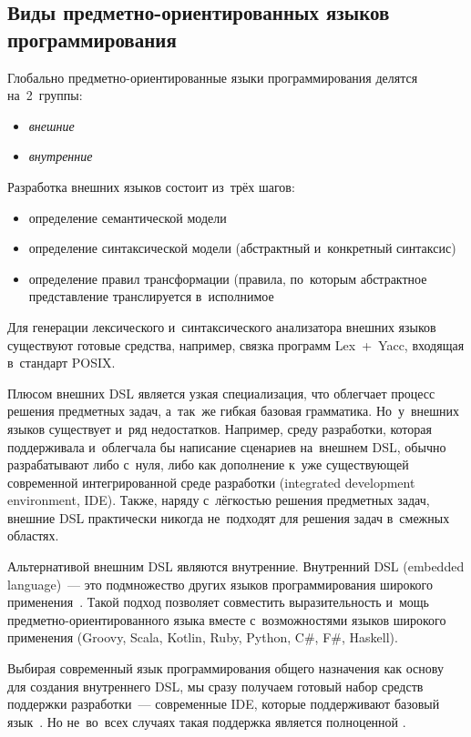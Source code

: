 \subsection{Виды предметно-ориентированных языков программирования} \label{sub122}
Глобально предметно-ориентированные языки программирования делятся на~2~группы: 
\begin{itemize} 
	\item{\textit{внешние}}
	\item{\textit{внутренние}}
\end{itemize}

Разработка внешних языков состоит из~трёх шагов:

\begin{itemize} 
	\item{определение семантической модели}
	\item{определение синтаксической модели (абстрактный и~конкретный синтаксис)}
	\item{определение правил трансформации (правила, по~которым абстрактное представление транслируется в~исполнимое}
\end{itemize}

Для генерации
лексического и~синтаксического анализатора внешних языков существуют готовые средства, например, связка программ Lex~+~Yacc, входящая в~стандарт POSIX. 

Плюсом внешних DSL является узкая специализация, что облегчает процесс решения предметных задач, а~так~же гибкая базовая грамматика. Но~у~внешних языков существует и~ряд недостатков. Например, среду разработки, которая поддерживала и~облегчала бы написание сценариев на~внешнем
DSL, обычно разрабатывают либо с~нуля, либо как
дополнение к~уже существующей современной интегрированной среде разработки (integrated
development environment, IDE). Также, наряду с~лёгкостью решения предметных задач, внешние DSL практически никогда не~подходят для решения задач в~смежных областях.

Альтернативой внешним DSL являются внутренние. Внутренний DSL (embedded language)~--- это подмножество других языков программирования широкого применения~\cite{VanDeursen2000}. Такой подход позволяет совместить выразительность и~мощь предметно-ориентированного языка вместе с~возможностями языков широкого применения (Groovy, Scala, Kotlin, Ruby, Python, C\#, F\#, Haskell). 

Выбирая современный язык программирования общего назначения как основу для создания
внутреннего DSL, мы сразу получаем готовый
набор средств поддержки разработки~--- современные IDE, которые поддерживают базовый язык~\cite{Botov}.
Но не~во~всех случаях такая поддержка является полноценной .


